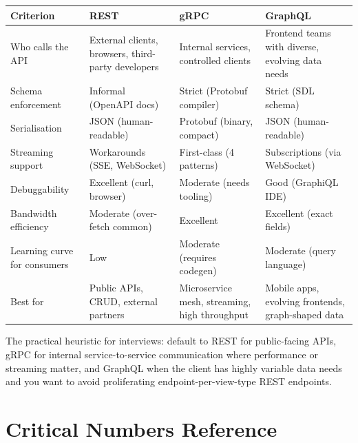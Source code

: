 \documentclass[11pt,a4paper]{article}
\begin{document}
\begin{center}
\renewcommand{\arraystretch}{1.4}
\begin{tabularx}{\textwidth}{lXXX}
\toprule
\textbf{Criterion} & \textbf{REST} & \textbf{gRPC} & \textbf{GraphQL} \\
\midrule
Who calls the API & External clients, browsers, third-party developers & Internal services, controlled clients & Frontend teams with diverse, evolving data needs \\
Schema enforcement & Informal (OpenAPI docs) & Strict (Protobuf compiler) & Strict (SDL schema) \\
Serialisation & JSON (human-readable) & Protobuf (binary, compact) & JSON (human-readable) \\
Streaming support & Workarounds (SSE, WebSocket) & First-class (4 patterns) & Subscriptions (via WebSocket) \\
Debuggability & Excellent (curl, browser) & Moderate (needs tooling) & Good (GraphiQL IDE) \\
Bandwidth efficiency & Moderate (over-fetch common) & Excellent & Excellent (exact fields) \\
Learning curve for consumers & Low & Moderate (requires codegen) & Moderate (query language) \\
Best for & Public APIs, CRUD, external partners & Microservice mesh, streaming, high throughput & Mobile apps, evolving frontends, graph-shaped data \\
\bottomrule
\end{tabularx}
\end{center}

The practical heuristic for interviews: default to REST for public-facing APIs, gRPC for internal service-to-service communication where performance or streaming matter, and GraphQL when the client has highly variable data needs and you want to avoid proliferating endpoint-per-view-type REST endpoints.

\section{Critical Numbers Reference}
\end{document}

